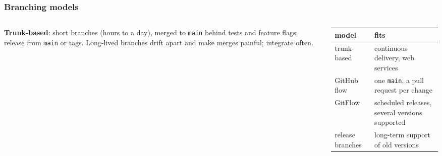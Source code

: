 \documentclass[aspectratio=169,10pt,compress]{beamer}
\begin{document}




\begin{frame}[t,fragile] \frametitle{Branching models}
  \begin{columns}[T]
    \begin{column}{0.5\textwidth}
      \begin{center}
      \end{center}
      \small \textbf{Trunk-based}: short branches (hours to a day), merged to \texttt{main} behind tests and feature flags; release from \texttt{main} or tags.
      Long-lived branches drift apart and make merges painful; integrate often.
    \end{column}
    \begin{column}{0.46\textwidth}
      \begin{center}\scriptsize
      \begin{tabular}{lL{0.27\textwidth}}
        \toprule
        \textbf{model}  & \textbf{fits} \\
        \midrule
        trunk-based     & continuous delivery, web services \\
        GitHub flow     & one \texttt{main}, a pull request per change \\
        GitFlow         & scheduled releases, several versions supported \\
        release branches & long-term support of old versions \\
        \bottomrule
      \end{tabular}
      \end{center}
    \end{column}
  \end{columns}
\end{frame}
\end{document}

